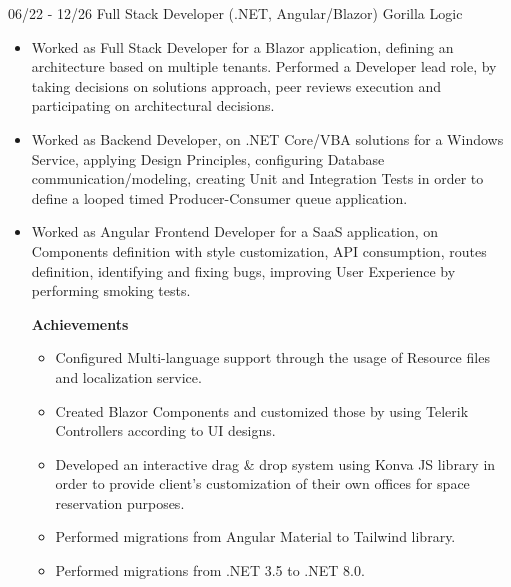 \documentclass[letterpaper]{twentysecondcv} %
\begin{document}
\begin{twenty}
{\begin{itemize}
            \end{itemize}
        }

        \twentyitem
        {06/22 - 12/26}
        {Full Stack Developer (.NET, Angular/Blazor)}
        {Gorilla Logic}
        {
            \begin{itemize}
                \item Worked as Full Stack Developer for a Blazor application, defining an architecture based on multiple tenants. Performed a Developer lead role, by taking decisions on solutions approach, peer reviews execution and participating on architectural decisions.

                \item Worked as Backend Developer, on .NET Core/VBA solutions for a Windows Service, applying Design Principles, configuring Database communication/modeling, creating Unit and Integration Tests in order to define a looped timed Producer-Consumer queue application.
                    
                \item Worked as Angular Frontend Developer for a SaaS application, on Components definition with style customization, API consumption, routes definition, identifying and fixing bugs, improving User Experience by performing smoking tests.

                \textbf{Achievements}
                \begin{itemize}
                    \item Configured Multi-language support through the usage of Resource files and localization service.
                
                    \item Created Blazor Components and customized those by using Telerik Controllers according to UI designs.
                
                    \item Developed an interactive drag \& drop system using Konva JS library in order to provide client's customization of their own offices for space reservation purposes.

                    \item Performed migrations from Angular Material to Tailwind library.

                    \item Performed migrations from .NET 3.5 to .NET 8.0.
                \end{itemize}
            

\end{itemize}}
\end{twenty}
\end{document}
